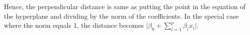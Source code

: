 \documentclass[../statistical_learning_notes.tex]{subfiles}
\begin{document}
Hence, the perpendicular distance is same as putting the point in the equation of the hyperplane and dividing by the norm of the coefficients. In the special case where the norm equals 1, the distance becomes $\lvert \beta_{0} + \sum_{i=1}^{p} \beta_{i}x_{i} \rvert$.



\end{document}
